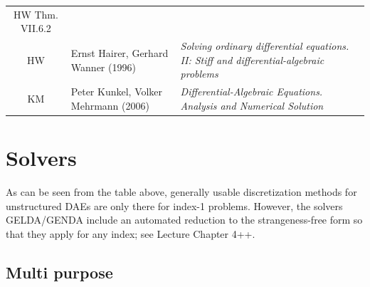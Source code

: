 \documentclass[]{book}
\theoremstyle{definition}
\theoremstyle{definition}
\theoremstyle{definition}
\theoremstyle{remark}
\begin{document}
\begin{longtable}[]{@{}cll@{}}
\begin{minipage}[t]{0.42\columnwidth}
HW Thm. VII.6.2\strut
\end{minipage}\tabularnewline
\begin{minipage}[t]{0.04\columnwidth}\centering
HW\strut
\end{minipage} & \begin{minipage}[t]{0.45\columnwidth}\raggedright
Ernst Hairer, Gerhard Wanner (1996)\strut
\end{minipage} & \begin{minipage}[t]{0.42\columnwidth}\raggedright
\emph{Solving ordinary differential equations. II: Stiff and differential-algebraic problems}\strut
\end{minipage}\tabularnewline
\begin{minipage}[t]{0.04\columnwidth}\centering
KM\strut
\end{minipage} & \begin{minipage}[t]{0.45\columnwidth}\raggedright
Peter Kunkel, Volker Mehrmann (2006)\strut
\end{minipage} & \begin{minipage}[t]{0.42\columnwidth}\raggedright
\emph{Differential-Algebraic Equations. Analysis and Numerical Solution}\strut
\end{minipage}\tabularnewline
\bottomrule
\end{longtable}

\hypertarget{solvers}{%
\section{Solvers}\label{solvers}}

As can be seen from the table above, generally usable discretization methods for unstructured DAEs are only there for index-1 problems. However, the solvers GELDA/GENDA include an automated reduction to the strangeness-free form so that they apply for any index; see Lecture Chapter 4++.

\hypertarget{multi-purpose}{%
\subsection{Multi purpose}\label{multi-purpose}}
\end{document}
